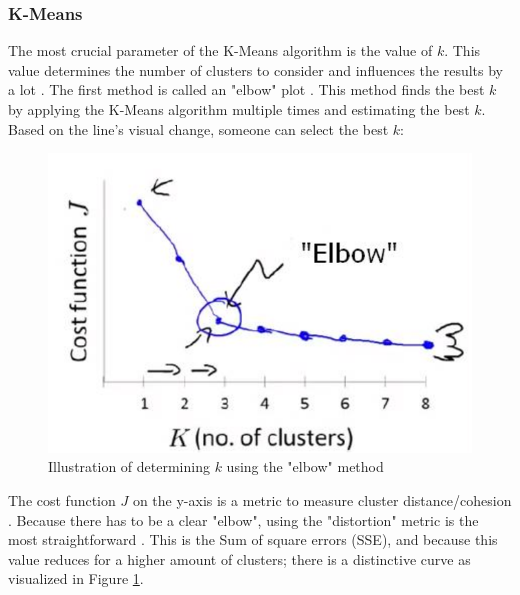 \subsubsection{K-Means} \label{theory:kmeans}
The most crucial parameter of the K-Means algorithm is the value of $k$.
This value determines the number of clusters to consider and influences the results by a lot \citep{ahmed_k-means_2020}.
The first method is called an "elbow" plot \citep{kodinariya_review_2013}.
This method finds the best $k$ by applying the K-Means algorithm multiple times and estimating the best $k$.
Based on the line's visual change, someone can select the best $k$:
\begin{figure}[H]
  \includegraphics{TheorethicalFramework/dentification-of-Elbow-point.png}
  \caption{Illustration of determining $k$ using the "elbow" method \citep{kodinariya_review_2013}}
  \label{elbow-method}
\end{figure}
The cost function $J$ on the y-axis is a metric to measure cluster distance/cohesion \citep{yuan_research_2019}.
Because there has to be a clear "elbow", using the "distortion" metric is the most straightforward \citep{yuan_research_2019}. This is the Sum of square errors (SSE), and because this value reduces for a higher amount of clusters; there is a distinctive curve as visualized in Figure \ref{elbow-method}.

